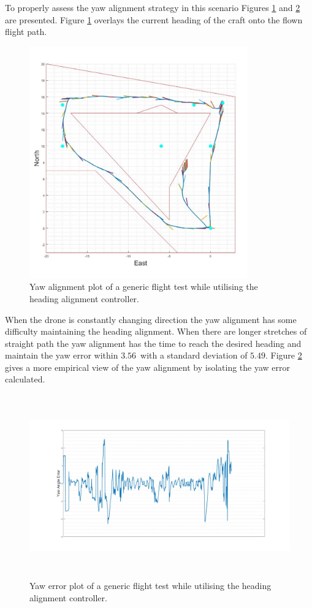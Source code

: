 		To properly assess the yaw alignment strategy in this scenario Figures \ref{IM_Test45} and \ref{IM_Test48} are presented. Figure \ref{IM_Test45} overlays the current heading of the craft onto the flown flight path.
		
		\begin{figure}[H]
			\centering
			\includegraphics[height = 10cm]{../References/Testing/FullRunAlignYaw.jpg} 
			\caption{Yaw alignment plot of a generic flight test while utilising the heading alignment controller.}
			\label{IM_Test45}
		\end{figure}
		
		When the drone is constantly changing direction the yaw alignment has some difficulty maintaining the heading alignment. When there are longer stretches of straight path the yaw alignment has the time to reach the desired heading and maintain the yaw error within $3.56$\textdegree\, with a standard deviation of $5.49$\textdegree.
		Figure \ref{IM_Test48} gives a more empirical view of the yaw alignment by isolating the yaw error calculated.
		
		\begin{figure}[H]
			\centering
			\includegraphics[height = 7.9cm]{../References/Testing/FullRunAlignYawGraph.jpg} 
			\caption{Yaw error plot of a generic flight test while utilising the heading alignment controller.}
			\label{IM_Test48}
		\end{figure}
				
